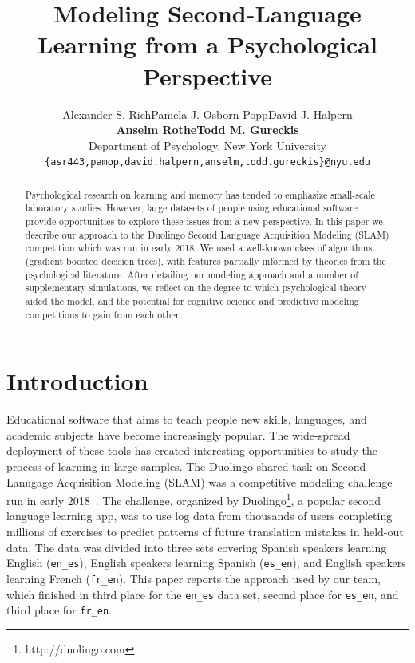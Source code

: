 \documentclass[11pt,a4paper]{article}
\title{Modeling Second-Language Learning from a Psychological Perspective}
\author{Alexander S. Rich\qquad Pamela J. Osborn Popp\qquad David J. Halpern\\
  \textbf{Anselm Rothe\qquad Todd M. Gureckis} \\
  Department of Psychology, New York University \\
  {\tt \{asr443,pamop,david.halpern,anselm,todd.gureckis\}@nyu.edu} \\}
\date{}
\begin{document}
\maketitle
\begin{abstract}
Psychological research on learning and memory
has tended to emphasize small-scale laboratory
studies.  However, large datasets of people using 
educational software provide opportunities to explore
these issues from a new perspective.  In this paper we
describe our approach to the Duolingo Second Language
Acquisition Modeling (SLAM) competition which was run in
early 2018.  We used a well-known class of algorithms (gradient boosted decision
trees), with features partially informed by theories from the psychological
literature. After detailing our modeling approach and a number of
supplementary simulations, we
reflect on the degree to which psychological theory aided the model, and
the potential for cognitive science and predictive modeling competitions to gain
from each other.
\end{abstract}

\section{Introduction}

Educational software that aims to teach people new skills, languages, and
academic subjects have become increasingly popular.  The wide-spread
deployment of these tools has created interesting opportunities to study
the process of learning in large samples. The Duolingo shared task on Second Lanugage Acquisition Modeling (SLAM)
was a competitive modeling challenge run in early 2018~\cite{slam18}.
The challenge, organized by Duolingo\footnote{http://duolingo.com}, a popular second
language learning app, was
to use log data from thousands of users completing millions of exercises to 
predict patterns of future translation mistakes in held-out data.  The data was
divided into three sets covering Spanish speakers learning English ({\tt en\_es}),
English speakers learning Spanish ({\tt es\_en}), and English speakers learning
French ({\tt fr\_en}).
This paper reports the approach used by our team, which finished in third place 
for the {\tt en\_es} data set, second place for {\tt es\_en}, and third place
for {\tt fr\_en}.
\end{document}
